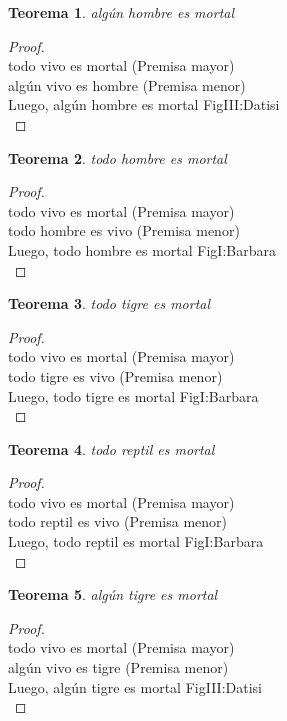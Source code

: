 ﻿\documentclass[12pt]{book}
\newtheorem{theorem}{Teorema}[chapter]
\newtheorem{proof}{Demostración}
\begin{document}
\begin{theorem}
algún hombre es mortal
\label{th: 67}
\end{theorem}\begin{proof}\\todo vivo es mortal	 (Premisa mayor) \\algún vivo es hombre	 (Premisa menor) \\Luego, algún hombre es mortal	FigIII:Datisi \\ \end{proof}
\begin{theorem}
todo hombre es mortal
\label{th: 68}
\end{theorem}\begin{proof}\\todo vivo es mortal	 (Premisa mayor) \\todo hombre es vivo	 (Premisa menor) \\Luego, todo hombre es mortal	FigI:Barbara \\ \end{proof}
\begin{theorem}
todo tigre es mortal
\label{th: 69}
\end{theorem}\begin{proof}\\todo vivo es mortal	 (Premisa mayor) \\todo tigre es vivo	 (Premisa menor) \\Luego, todo tigre es mortal	FigI:Barbara \\ \end{proof}
\begin{theorem}
todo reptil es mortal
\label{th: 70}
\end{theorem}\begin{proof}\\todo vivo es mortal	 (Premisa mayor) \\todo reptil es vivo	 (Premisa menor) \\Luego, todo reptil es mortal	FigI:Barbara \\ \end{proof}
\begin{theorem}
algún tigre es mortal
\label{th: 71}
\end{theorem}\begin{proof}\\todo vivo es mortal	 (Premisa mayor) \\algún vivo es tigre	 (Premisa menor) \\Luego, algún tigre es mortal	FigIII:Datisi \\ \end{proof}
\end{document}
